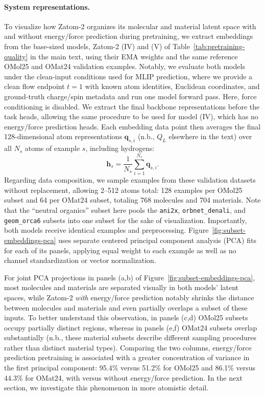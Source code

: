 \documentclass{article} %
\begin{document}
\paragraph{System representations.} 
To visualize how Zatom-2 organizes its molecular and material latent space with and without energy/force prediction during pretraining, we extract embeddings from the base-sized models, Zatom-2 (IV) and (V) of Table~\ref{tab:pretraining-quality} in the main text, using their EMA weights and the same reference OMol25 and OMat24 validation examples. Notably, we evaluate both models under the clean-input conditions used for MLIP prediction, where we provide a clean flow endpoint $t=1$ with known atom identities, Euclidean coordinates, and ground-truth charge/spin metadata and run one model forward pass. Here, force conditioning is disabled. We extract the final backbone representations before the task heads, allowing the same procedure to be used for model (IV), which has no energy/force prediction heads. Each embedding data point then averages the final 128-dimensional atom representations $\mathbf{q}_{s,i}$ (n.b., $Q_L$ elsewhere in the text) over all $N_s$ atoms of example $s$, including hydrogens:
\begin{equation}
  \mathbf{h}_s = \frac{1}{N_s}\sum_{i=1}^{N_s}\mathbf{q}_{s,i}.
\end{equation}
Regarding data composition, we sample examples from these validation datasets without replacement, allowing 2--512 atoms total: 128 examples per OMol25 subset and 64 per OMat24 subset, totaling 768 molecules and 704 materials. Note that the ``neutral organics'' subset here pools the \texttt{ani2x}, \texttt{orbnet\_denali}, and \texttt{geom\_orca6} subsets into one subset for the sake of visualization. Importantly, both models receive identical examples and preprocessing. Figure~\ref{fig:subset-embeddings-pca} uses separate centered principal component analysis (PCA) fits for each of its panels, applying equal weight to each example as well as no channel standardization or vector normalization.

For joint PCA projections in panels (a,b) of Figure~\ref{fig:subset-embeddings-pca}, most molecules and materials are separated visually in both models' latent spaces, while Zatom-2 \emph{with} energy/force prediction notably shrinks the distance between molecules and materials and even partially overlaps a subset of these inputs. To better understand this observation, in panels (c,d) OMol25 subsets occupy partially distinct regions, whereas in panels (e,f) OMat24 subsets overlap substantially (n.b., these material subsets describe different sampling procedures rather than distinct material types). Comparing the two columns, energy/force prediction pretraining is associated with a greater concentration of variance in the first principal component: 95.4\% versus 51.2\% for OMol25 and 86.1\% versus 44.3\% for OMat24, with versus without energy/force prediction. In the next section, we investigate this phenomenon in more atomistic detail.
\end{document}
